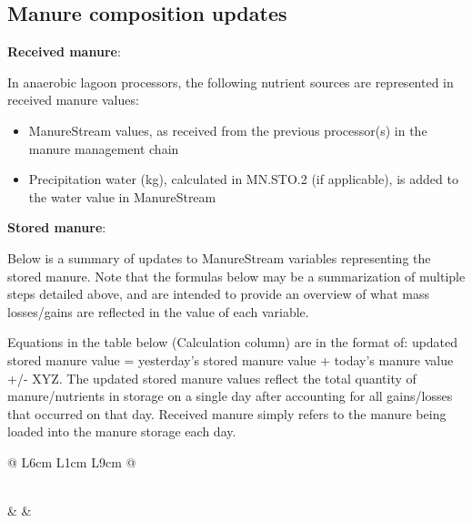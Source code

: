 \begin{refsection}
\vspace{0.2cm}

\subsection{Manure composition updates}
    \vspace{0.15cm}
\textbf{Received manure}: 
    \vspace{0.15cm}
    
    In anaerobic lagoon processors, the following nutrient sources are represented in received manure values:
    \vspace{0.15cm}
    
    \begin{itemize}
        \item ManureStream values, as received from the previous processor(s) in the manure management chain
        \item Precipitation water (kg), calculated in MN.STO.2 (if applicable), is added to the water value in ManureStream
    \end{itemize}
    \vspace{0.2cm}
    
 \textbf{Stored manure}: 
    \vspace{0.15cm}

Below is a summary of updates to ManureStream variables representing the stored manure. Note that the formulas below may be a summarization of multiple steps detailed above, and are intended to provide an overview of what mass losses/gains are reflected in the value of each variable.
    \vspace{0.15cm}

Equations in the table below (Calculation column) are in the format of: updated stored manure value = yesterday’s stored manure value + today’s manure value +/- XYZ. The updated stored manure values reflect the total quantity of manure/nutrients in storage on a single day after accounting for all gains/losses that occurred on that day. Received manure simply refers to the manure being loaded into the manure storage each day. 
\vspace{0.25cm}

\renewcommand{\arraystretch}{1.3}
\begin{longtable}{@{} L{6cm} L{1cm} L{9cm} @{}}
\caption{Manure storage variable calculations} \\
\toprule
{} & 
 & 
 \\
\midrule
\endfirsthead


\end{longtable}
\end{refsection}

